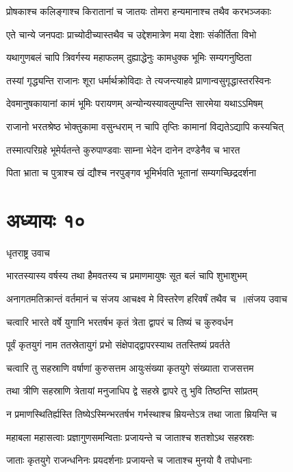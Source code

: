 \twolineshloka
{प्रोषकाश्च कलिङ्गाश्च किरातानां च जातयः}
{तोमरा हन्यमानाश्च तथैव करभञ्जकाः}


\twolineshloka
{एते चान्ये जनपदाः प्राच्योदीच्यास्तथैव च}
{उद्देशमात्रेण मया देशाः संकीर्तिता विभो}


\twolineshloka
{यथागुणबलं चापि त्रिवर्गस्य महाफलम्}
{दुह्याद्धेनुः कामधुक्क भूमिः सम्यगनुष्ठिता}


\twolineshloka
{तस्यां गृद्ध्यन्ति राजानः शूरा धर्मार्थक्रोविदाः}
{ते त्यजन्त्याहवे प्राणान्वसुगृद्धास्तरस्विनः}


\twolineshloka
{देवमानुषकायानां कामं भूमिः परायणम्}
{अन्योन्यस्यावलुम्पन्ति सारमेया यथाऽऽमिषम्}


\twolineshloka
{राजानो भरतश्रेष्ठ भोक्तुकामा वसुन्धराम्}
{न चापि तृप्तिः कामानां विद्यतेऽद्यापि कस्यचित्}


\twolineshloka
{तस्मात्परिग्रहे भूमेर्यतन्ते कुरुपाण्डवाः}
{साम्ना भेदेन दानेन दण्डेनैव च भारत}


\twolineshloka
{पिता भ्राता च पुत्राश्च खं द्यौश्च नरपुङ्गव}
{भूमिर्भवति भूतानां सम्यगच्छिद्रदर्शना}


\chapter{अध्यायः १०}
\twolineshloka
{धृतराष्ट्र उवाच}
{}


\twolineshloka
{भारतस्यास्य वर्षस्य तथा हैमवतस्य च}
{प्रमाणमायुषः सूत बलं चापि शुभाशुभम्}


\threelineshloka
{अनागतमतिक्रान्तं वर्तमानं च संजय}
{आचक्ष्व मे विस्तरेण हरिवर्षं तथैव च ॥संजय उवाच}
{}


\twolineshloka
{चत्वारि भारते वर्षे युगानि भरतर्षभ}
{कृतं त्रेता द्वापरं च तिष्यं च कुरुवर्धन}


\twolineshloka
{पूर्वं कृतयुगं नाम ततस्रेतायुगं प्रभो}
{संक्षेपाद्द्वापरस्याथ ततस्तिष्यं प्रवर्तते}


\twolineshloka
{चत्वारि तु सहस्राणि वर्षाणां कुरुसत्तम}
{आयुःसंख्या कृतयुगे संख्याता राजसत्तम}


\twolineshloka
{तथा त्रीणि सहस्राणि त्रेतायां मनुजाधिप}
{द्वे सहस्रे द्वापरे तु भुवि तिष्ठन्ति सांप्रतम्}


\twolineshloka
{न प्रमाणस्थितिर्ह्यस्ति तिष्येऽस्मिन्भरतर्षभ}
{गर्भस्थाश्च म्रियन्तेऽत्र तथा जाता म्रियन्ति च}


\twolineshloka
{महाबला महासत्वाः प्रज्ञागुणसमन्विताः}
{प्रजायन्ते च जाताश्च शतशोऽथ सहस्रशः}


\twolineshloka
{जाताः कृतयुगे राजन्धनिनः प्रयदर्शनाः}
{प्रजायन्ते च जाताश्च मुनयो वै तपोधनाः}


